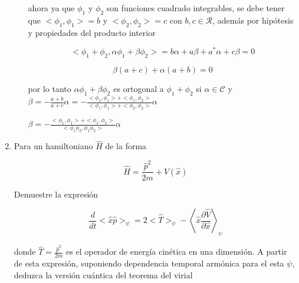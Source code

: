 \documentclass[12pt,a4paper]{article}
\begin{document}
\begin{enumerate}
\begin{enumerate}
        ahora ya que $\phi_1$ y $\phi_2$ son funciones cuadrado integrables, se debe tener que $<\phi_1,\phi_1> = b$ y $<\phi_2,\phi_2> = c$ con $b,c \in \mathcal{R}$, además por hipótesis y propiedades del producto interior
        
        \begin{equation*}
            <\phi_1 + \phi_2 , \alpha \phi_1 + \beta \phi_2> = b \alpha  + a \beta +a^* \alpha + c \beta = 0 
        \end{equation*}
        
        \begin{equation*}
            \beta (a+c) + \alpha (a+b) = 0
        \end{equation*}
        
        por lo tanto $\alpha \phi_1 + \beta \phi_2$ es ortogonal a $\phi_1 + \phi_2$ si  
        $\alpha \in \mathcal{C}$ y $\beta = -\frac{a+b}{a+c} \alpha = - \frac{<\phi_1,\phi_1>+ <\phi_1,\phi_2>}{<\phi_1,\phi_1>+<\phi_2,\phi_2>} \alpha $
        
        $\beta = - \frac{<\phi_1, \phi_1> + <\phi_1,\phi_2>}{<\phi_1\phi_2,\phi_1\phi_2>} \alpha$
        
        
        
    \end{enumerate}
    
    
    
    
    
    
    
    
    \item Para un hamiltoniano $\hat{H }$ de la forma
    
    \begin{equation*}
        \hat{H} = \frac{\hat{p}^2}{2m} + \hat{V}(\hat{x})
    \end{equation*}
    
    Demuestre la expresión
    
    \begin{equation*}
        \frac{d}{dt} <\hat{x}\hat{p}>_\psi = 2 <\hat{T}>_\psi - \left<\hat{x}\frac{\partial \hat{V}}{\partial \hat{x}}\right>_\psi
    \end{equation*}
    
    donde $\hat{T} = \frac{\hat{p}^2}{2m}$ es el operador de energía cinética en una dimensión. A partir de esta expresión, suponiendo dependencia temporal armónica para el esta $\psi$, deduzca la versión cuántica del teorema del virial
    

\end{enumerate}
\end{document}
